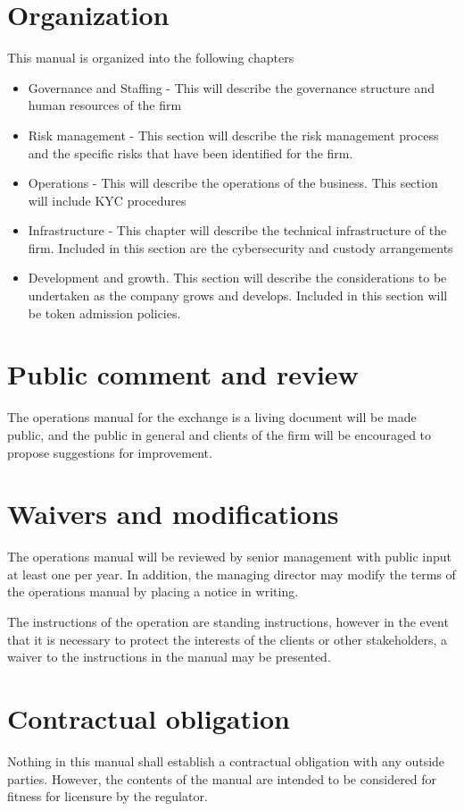 \section{Organization}

This manual is organized into the following chapters

\begin{itemize}
  \item Governance and Staffing - This will describe the governance
    structure and human resources of the firm
  \item Risk management - This section will describe the risk
    management process and the specific risks that have been
    identified for the firm.
  \item Operations - This will describe the operations of the
    business.  This section will include KYC procedures
  \item Infrastructure - This chapter will describe the technical
    infrastructure of the firm.  Included in this section are the
    cybersecurity and custody arrangements
  \item Development and growth.  This section will describe the
    considerations to be undertaken as the company grows and develops.
    Included in this section will be token admission policies.
\end{itemize}

\section{Public comment and review}
The operations manual for the exchange is a living document will be
made public, and the public in general and clients of the firm will be
encouraged to propose suggestions for improvement.

\section{Waivers and modifications}
The operations manual will be reviewed by senior management with
public input at least one per year.  In addition, the managing
director may modify the terms of the operations manual by placing a
notice in writing.

The instructions of the operation are standing instructions, however
in the event that it is necessary to protect the interests of the
clients or other stakeholders, a waiver to the instructions in the
manual may be presented.

\section{Contractual obligation}
Nothing in this manual shall establish a contractual obligation with
any outside parties.  However, the contents of the manual are intended
to be considered for fitness for licensure by the regulator.
